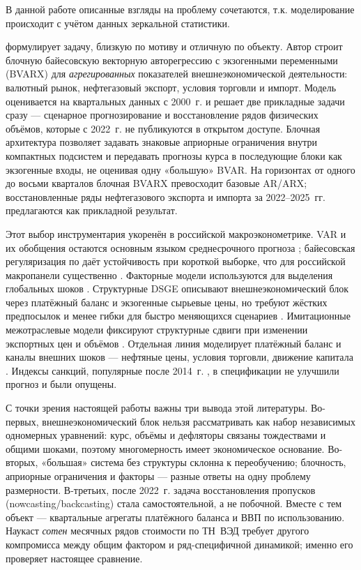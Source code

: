 \documentclass[12pt]{article}
\begin{document}
В данной работе описанные взгляды на проблему сочетаются, т.к. моделирование происходит с учётом данных зеркальной статистики.

\citet{slabolitskiy2026} формулирует задачу, близкую по мотиву и отличную по объекту. Автор строит блочную байесовскую векторную авторегрессию с экзогенными переменными (BVARX) для \emph{агрегированных} показателей внешнеэкономической деятельности: валютный рынок, нефтегазовый экспорт, условия торговли и импорт. Модель оценивается на квартальных данных с 2000~г. и решает две прикладные задачи сразу --- сценарное прогнозирование и восстановление рядов физических объёмов, которые с 2022~г. не публикуются в открытом доступе. Блочная архитектура позволяет задавать знаковые априорные ограничения внутри компактных подсистем и передавать прогнозы курса в последующие блоки как экзогенные входы, не оценивая одну «большую» BVAR. На горизонтах от одного до восьми кварталов блочная BVARX превосходит базовые AR/ARX; восстановленные ряды нефтегазового экспорта и импорта за 2022--2025~гг. предлагаются как прикладной результат.

Этот выбор инструментария укоренён в российской макроэконометрике. VAR и их обобщения остаются основным языком среднесрочного прогноза \citep{fokin2019,zubarev2023}; байесовская регуляризация по \citet{litterman1986} даёт устойчивость при короткой выборке, что для российской макропанели существенно \citep{deryugina2015,pestova2016,banbura2010}. Факторные модели используются для выделения глобальных шоков \citep{zubarev2022}. Структурные DSGE описывают внешнеэкономический блок через платёжный баланс и экзогенные сырьевые цены, но требуют жёстких предпосылок и менее гибки для быстро меняющихся сценариев \citep{kreptsev2017,polbin2024,votinov2025,andreev2022}. Имитационные межотраслевые модели фиксируют структурные сдвиги при изменении экспортных цен и объёмов \citep{beklaryan2018}. Отдельная линия моделирует платёжный баланс и каналы внешних шоков --- нефтяные цены, условия торговли, движение капитала \citep{pilnik2017,pilnik2018,zubarev2022}. Индексы санкций, популярные после 2014~г. \citep{dreger2016}, в спецификации \citet{slabolitskiy2026} не улучшили прогноз и были опущены.

С точки зрения настоящей работы важны три вывода этой литературы. Во-первых, внешнеэкономический блок нельзя рассматривать как набор независимых одномерных уравнений: курс, объёмы и дефляторы связаны тождествами и общими шоками, поэтому многомерность имеет экономическое основание. Во-вторых, «большая» система без структуры склонна к переобучению; блочность, априорные ограничения и факторы --- разные ответы на одну проблему размерности. В-третьих, после 2022~г. задача восстановления пропусков (nowcasting/backcasting) стала самостоятельной, а не побочной. Вместе с тем объект \citet{slabolitskiy2026} --- квартальные агрегаты платёжного баланса и ВВП по использованию. Наукаст \emph{сотен} месячных рядов стоимости по ТН~ВЭД требует другого компромисса между общим фактором и ряд-специфичной динамикой; именно его проверяет настоящее сравнение.
\end{document}

